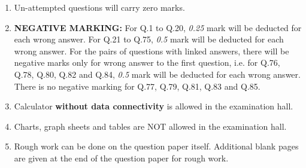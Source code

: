 \documentclass[journal,12pt,onecolumn]{IEEEtran}
\theoremstyle{remark}
\begin{document}
\begin{enumerate}
    \item Un-attempted questions will carry zero marks.
    \item \textbf{NEGATIVE MARKING:} For Q.1 to Q.20, \textit{0.25} mark will be deducted for each wrong answer. For Q.21 to Q.75, \textit{0.5} mark will be deducted for each wrong answer. For the pairs of questions with linked answers, there will be negative marks only for wrong answer to the first question, i.e. for Q.76, Q.78, Q.80, Q.82 and Q.84, \textit{0.5} mark will be deducted for each wrong answer. There is no negative marking for Q.77, Q.79, Q.81, Q.83 and Q.85.

    \item Calculator \textbf{without data connectivity} is allowed in the examination hall.

    \item Charts, graph sheets and tables are NOT allowed in the examination hall.

    \item Rough work can be done on the question paper itself. Additional blank pages are given at the end of the question paper for rough work.
\end{enumerate}

\newpage
\end{document}

